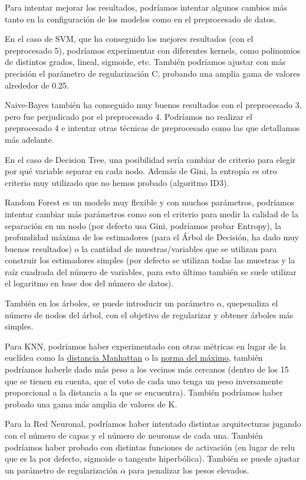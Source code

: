 \documentclass{article}
\begin{document}
Para intentar mejorar los resultados, podríamos intentar algunos
cambios más tanto en la configuración de los modelos como en el
preprocesado de datos.

En el caso de SVM, que ha conseguido los mejores resultados (con el
preprocesado 5), podríamos experimentar con diferentes kernels, como
polinomios de distintos grados, lineal, sigmoide, etc. También
podríamos ajustar con más precisión el parámetro de regularización C,
probando una amplia gama de valores alrededor de 0.25.

Naive-Bayes también ha conseguido muy buenos resultados con el
preprocesado 3, pero fue perjudicado por el preprocesado 4. Podríamos
no realizar el preprocesado 4 e intentar otras técnicas de
preprocesado como las que detallamos más adelante.

En el caso de Decision Tree, una posibilidad sería cambiar de criterio
para elegir por qué variable separar en cada nodo. Además de Gini, la
entropía es otro criterio muy utilizado que no hemos probado
(algoritmo ID3).

Random Forest es un modelo muy flexible y con muchos parámetros,
podríamos intentar cambiar más parámetros como son el criterio para
medir la calidad de la separación en un nodo (por defecto usa Gini,
podríamos probar Entropy), la profundidad máxima de los estimadores
(para el Árbol de Decisión, ha dado muy buenos resultados) o la
cantidad de muestras/variables que se utilizan para construir los
estimadores simples (por defecto se utilizan todas las muestras y la
raíz cuadrada del número de variables, para esto último también se
suele utilizar el logaritmo en base dos del número de datos).

También en los árboles, se puede introducir un parámetro $\alpha$,
quepenaliza el número de nodos del árbol, con el objetivo de
regularizar y obtener árboles más simples.

Para KNN, podríamos haber experimentado con otras métricas en lugar de
la euclídea como la
\href{https://en.wikipedia.org/wiki/Taxicab_geometry}{distancia
  Manhattan} o la
\href{https://en.wikipedia.org/wiki/Uniform_norm}{norma del máximo},
también podríamos haberle dado más peso a los vecinos más cercanos
(dentro de los 15 que se tienen en cuenta, que el voto de cada uno
tenga un peso inversamente proporcional a la distancia a la que se
encuentra). También podríamos haber probado una gama más amplia de
valores de K.

Para la Red Neuronal, podríamos haber intentado distintas
arquitecturas jugando con el número de capas y el número de neuronas
de cada una. También podríamos haber probado con distintas funciones
de activación (en lugar de relu que es la por defecto, sigmoide o
tangente hiperbólica). También se puede ajustar un parámetro de
regularización $\alpha$ para penalizar los pesos elevados.
\end{document}
